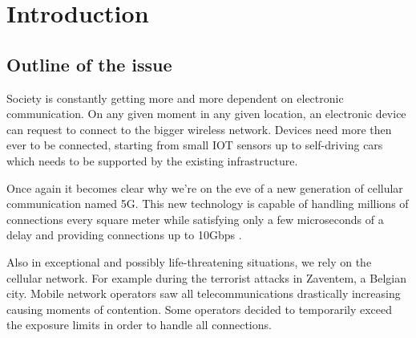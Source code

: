 %

\chapter{Introduction}
\label{chap:intro}

\section{Outline of the issue} %
\label{sec:issue}



Society is constantly getting more and more dependent on electronic communication. On any given moment in any given location, an electronic device
can request to connect to the bigger wireless network. Devices need more then ever to be connected, starting from small IOT sensors up to self-driving cars
which needs to be supported by the existing infrastructure. 

Once again it becomes clear why we're on the eve of a new generation of cellular communication named 5G. 
This new technology is capable of handling millions of connections every square meter %
while satisfying only a few microseconds of a delay and providing connections up to 10Gbps \cite{5GFeatures}.

Also in exceptional and possibly life-threatening situations, we rely on the cellular network. For example during the terrorist attacks in Zaventem, a Belgian city.
Mobile network operators saw all telecommunications drastically increasing causing moments of contention. Some operators decided to temporarily exceed the exposure limits in
order to handle all connections. \cite{baseZaventem}

